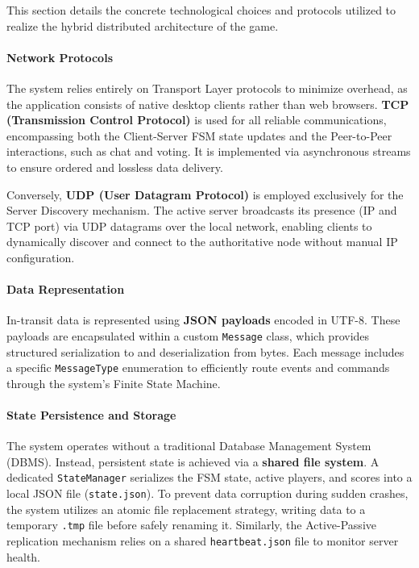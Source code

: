 \documentclass{scrartcl}
\begin{document}
This section details the concrete technological choices and protocols utilized to realize 
the hybrid distributed architecture of the game.

\paragraph{Network Protocols}
The system relies entirely on Transport Layer protocols to minimize overhead, 
as the application consists of native desktop clients rather than web browsers. 
\textbf{TCP (Transmission Control Protocol)} is used for all reliable communications, 
encompassing both the Client-Server FSM state updates and the Peer-to-Peer interactions, 
such as chat and voting. 
It is implemented via asynchronous streams to ensure ordered and lossless data delivery.

Conversely, \textbf{UDP (User Datagram Protocol)} is employed exclusively for the Server Discovery mechanism. 
The active server broadcasts its presence (IP and TCP port) via UDP datagrams over the local network, 
enabling clients to dynamically discover and connect to the authoritative node without manual IP configuration.

\paragraph{Data Representation}
In-transit data is represented using \textbf{JSON payloads} encoded in UTF-8. 
These payloads are encapsulated within a custom \texttt{Message} class, which provides structured serialization to and deserialization from bytes. 
Each message includes a specific \texttt{MessageType} enumeration to efficiently route events and commands through the system's Finite State Machine.

\paragraph{State Persistence and Storage}
The system operates without a traditional Database Management System (DBMS). 
Instead, persistent state is achieved via a \textbf{shared file system}. 
A dedicated \texttt{StateManager} serializes the FSM state, active players, and scores into a local JSON file (\texttt{state.json}). 
To prevent data corruption during sudden crashes, the system utilizes an atomic file replacement strategy, 
writing data to a temporary \texttt{.tmp} file before safely renaming it. 
Similarly, the Active-Passive replication mechanism relies on a shared \texttt{heartbeat.json} file to monitor server health.
\end{document}
